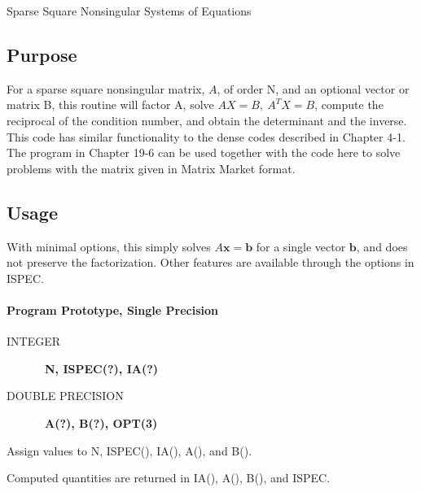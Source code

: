 \documentclass[twoside]{MATH77}
\begin{document}
  Sparse Square Nonsingular Systems of Equations


\subsection{Purpose}

For a sparse square nonsingular matrix, $A$, of order N, and an
optional vector or matrix B, this routine will factor A, solve $A X =
B, \ A^T X = B$, compute the reciprocal of the condition number, and
obtain the determinant and the inverse.  This code has similar
functionality to the dense codes described in Chapter 4-1.  The
program in Chapter 19-6 can be used together with the code here to
solve problems with the matrix given in Matrix Market format.

\subsection{Usage}
With minimal options, this simply solves $A \mathbf{x} = \mathbf{b}$
for a single vector $\mathbf{b}$, and does not preserve the
factorization.  Other features are available through the options in
ISPEC.

\paragraph{Program Prototype, Single Precision}

\begin{description}

\item[INTEGER] \ {\bf N, ISPEC(?), IA(?)}

\item[DOUBLE PRECISION] \ {\bf A(?), B(?), OPT(3)}

\end{description}

Assign values to N, ISPEC(), IA(),  A(), and B().

\begin{center}
\end{center}

Computed quantities are returned in IA(), A(), B(), and ISPEC.
\end{document}
